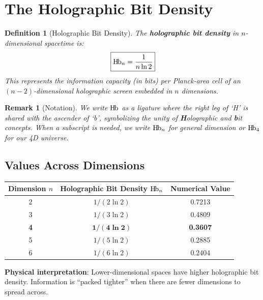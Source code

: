 \documentclass[11pt,a4paper]{article}
\newtheorem{definition}[theorem]{Definition}
\newtheorem{remark}[theorem]{Remark}
\newcommand{\Hb}{\textnormal{H\kern-0.12em b}}
\newcommand{\Hbn}{\Hb_n}
\newcommand{\Hbfour}{\Hb_4}
\begin{document}
\section{The Holographic Bit Density}
\label{sec:definition}

\begin{definition}[Holographic Bit Density]
The \textbf{holographic bit density} in $n$-dimensional spacetime is:
\begin{equation}
\boxed{\Hbn = \frac{1}{n \ln 2}}
\end{equation}
This represents the information capacity (in bits) per Planck-area cell of an $(n-2)$-dimensional holographic screen embedded in $n$ dimensions.
\end{definition}

\begin{remark}[Notation]
We write $\Hb$ as a ligature where the right leg of `H' is shared with the ascender of `b', symbolizing the unity of \textbf{H}olographic and \textbf{b}it concepts. When a subscript is needed, we write $\Hbn$ for general dimension or $\Hbfour$ for our 4D universe.
\end{remark}

\subsection{Values Across Dimensions}

\begin{center}
\begin{tabular}{ccc}
\toprule
\textbf{Dimension $n$} & \textbf{Holographic Bit Density $\Hbn$} & \textbf{Numerical Value} \\
\midrule
2 & $1/(2\ln 2)$ & 0.7213 \\
3 & $1/(3\ln 2)$ & 0.4809 \\
\textbf{4} & $\mathbf{1/(4\ln 2)}$ & \textbf{0.3607} \\
5 & $1/(5\ln 2)$ & 0.2885 \\
6 & $1/(6\ln 2)$ & 0.2404 \\
\bottomrule
\end{tabular}
\end{center}

\textbf{Physical interpretation}: Lower-dimensional spaces have higher holographic bit density. Information is ``packed tighter'' when there are fewer dimensions to spread across.

\end{document}

